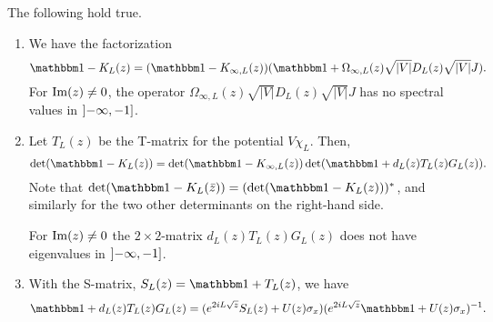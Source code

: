 \begin{lemma}\label{wo03t}
The following hold true.
\begin{enumerate}
\item
We have the factorization
\begin{equation}\label{wo03t00}
  \id - K_L(z) = (\id - K_{\infty,L}(z))(\id + \Omega_{\infty,L}(z)\sqrt{|V|}D_L(z)\sqrt{|V|}J) .
\end{equation}
For $\operatorname{Im}(z)\neq 0$, the operator $\Omega_{\infty,L}(z)\sqrt{|V|}D_L(z)\sqrt{|V|}J$ has no spectral values
in $\interval[open left]{-\infty}{-1}$.
\item
Let $T_L(z)$ be the T-matrix for the potential $V\chi_L$. Then,
\begin{equation}\label{wo03t01}
  \det(\id-K_L(z))
      = \det(\id-K_{\infty,L}(z)) \det(\id+d_L(z) T_L(z)G_L(z)) .
\end{equation}
Note that $\det(\id-K_L(\bar{z})) = (\det(\id-K_L(z)))^*$, and similarly for the two other determinants on the right-hand side.

For $\operatorname{Im}(z)\neq 0$ the $2\times 2$-matrix $d_L(z)T_L(z)G_L(z)$ does not have eigenvalues in $\interval[open left]{-\infty}{-1}$.
\item
With the S-matrix, $S_L(z)=\id+T_L(z)$, we have
\begin{equation}\label{wo03t02}
  \id+d_L(z) T_L(z)G_L(z) = (e^{2iL\sqrt{z}}S_L(z) + U(z)\sigma_x)(e^{2iL\sqrt{z}}\id + U(z)\sigma_x)^{-1} .
\end{equation}
\end{enumerate}
\end{lemma}
